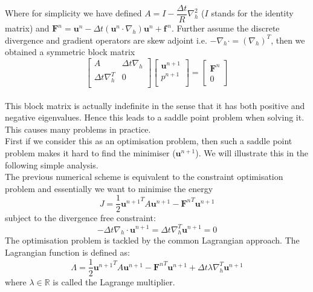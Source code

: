 Where for simplicity we have defined $A = I - \dfrac{\Delta t}{R}\nabla_h^2$ ($I$ stands for the identity matrix) and
$\textbf{F}^n = \textbf{u}^n  - \Delta t(\textbf{u}^n\cdot\nabla_h)\textbf{u}^n + \textbf{f}^{\,n}$. Further assume the discrete divergence and gradient operators are skew adjoint i.e. $-\nabla_h \cdot = (\nabla_h)^T$, then we obtained a symmetric block matrix \cite{maria2003application}\\

\begin{equation}\label{backward Euler symmetric block matrix form}
\begin{bmatrix}
A & \Delta t \nabla_h\\
\Delta t \nabla_h^T & 0\\
\end{bmatrix}
\begin{bmatrix}
\textbf{u}^{n+1}\\
p^{n+1}\\
\end{bmatrix}
= \begin{bmatrix}
\textbf{F}^n\\
0
\end{bmatrix}
\end{equation}\\
This block matrix is actually indefinite in the sense that it has both positive and negative eigenvalues. Hence this leads to a saddle point problem when solving it. This causes many problems  in practice.\\

First if we consider this as an optimisation problem, then such a saddle point problem makes it hard to find the minimiser ($\textbf{u}^{n+1}$). We will illustrate this in the following simple analysis.\\

The previous numerical scheme is equivalent to the constraint optimisation problem and essentially we want to minimise the energy 
\begin{equation*}\label{energy optimisation formulation}
J = \dfrac{1}{2}{\textbf{u}^{n+1}}^T A\textbf{u}^{n+1} - {\textbf{F}^n}^T\textbf{u}^{n+1}
\end{equation*}
subject to the divergence free constraint:
\begin{equation*}
-\Delta t \nabla_h \cdot \textbf{u}^{n+1} = \Delta t \nabla_h^T \textbf{u}^{n+1} = 0
\end{equation*}
The optimisation problem is tackled by the common Lagrangian approach. The Lagrangian function is defined as:
\begin{equation*}\label{eq:Lagrangian function}
\Lambda = \dfrac{1}{2}{\textbf{u}^{n+1}}^T A\textbf{u}^{n+1} - {\textbf{F}^n}^T\textbf{u}^{n+1} + \Delta t \lambda \nabla_h^T \textbf{u}^{n+1}
\end{equation*}
where $\lambda \in \mathbb{R}$ is called the Lagrange multiplier.\\

